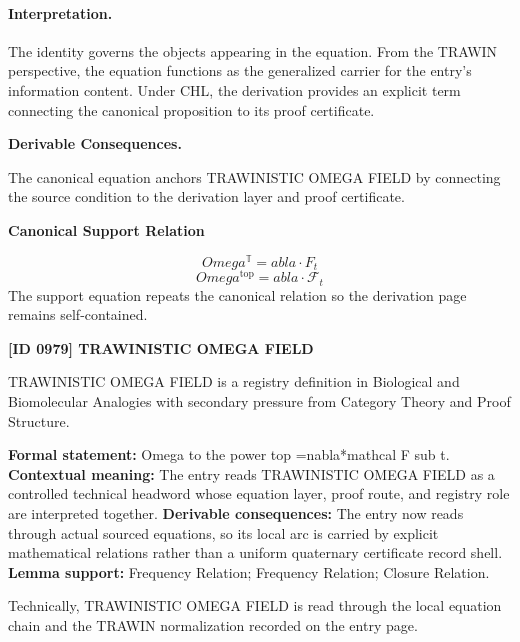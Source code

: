 \paragraph{Interpretation.}
The identity governs the objects appearing in the equation. From the TRAWIN perspective, the equation functions as the generalized carrier for the entry’s information content. Under CHL, the derivation provides an explicit term connecting the canonical proposition to its proof certificate.

\par\vspace{0.35em}
\noindent\textbf{Derivable Consequences.}\quad
\begingroup
\footnotesize
\raggedright
The canonical equation anchors TRAWINISTIC OMEGA FIELD by connecting the source condition to the derivation layer and proof certificate.
\par\endgroup

\noindent\textbf{Canonical Support Relation}\par
\[
Omega^{\mathbb{T}}= abla\cdot F_{t}
\]
\[
Omega^{\mathrm{top}}= abla\cdot\mathcal{F}_{t}
\]
\noindent The support equation repeats the canonical relation so the derivation page remains self-contained.\par

\clearpage
\noindent\textbf{[ID 0979] TRAWINISTIC OMEGA FIELD}\par
\vspace{0.35em}
\begingroup\small
{}
TRAWINISTIC OMEGA FIELD is a registry definition in Biological and Biomolecular Analogies with secondary pressure from Category Theory and Proof Structure.

\begingroup\footnotesize\setlength{\emergencystretch}{3em}\sloppy
\textbf{Formal statement:} Omega to the power top =nabla*mathcal F sub t. \textbf{Contextual meaning:} The entry reads TRAWINISTIC OMEGA FIELD as a controlled technical headword whose equation layer, proof route, and registry role are interpreted together. \textbf{Derivable consequences:} The entry now reads through actual sourced equations, so its local arc is carried by explicit mathematical relations rather than a uniform quaternary certificate record shell. \textbf{Lemma support:} Frequency Relation; Frequency Relation; Closure Relation.\par
\endgroup

Technically, TRAWINISTIC OMEGA FIELD is read through the local equation chain and the TRAWIN normalization recorded on the entry page.

